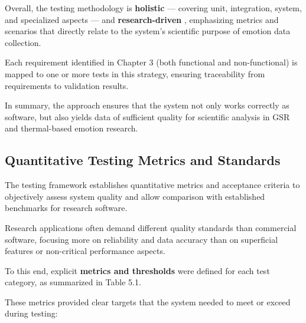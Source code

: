 Overall, the testing methodology is \textbf{holistic}
--- covering unit, integration, system, and specialized aspects --- and \textbf{research-driven}
, emphasizing metrics and scenarios that directly relate to the system's
scientific purpose of emotion data collection.

Each requirement identified in Chapter 3 (both functional and non-functional) is
mapped to one or more tests in this strategy, ensuring traceability from
requirements to validation results.

In summary, the approach ensures that the system not only works correctly as
software, but also yields data of sufficient quality for scientific analysis in
GSR and thermal-based emotion research.

\subsection{Quantitative Testing Metrics and Standards}

The testing framework establishes quantitative metrics and acceptance criteria
to objectively assess system quality and allow comparison with established
benchmarks for research software.

Research applications often demand different quality standards than commercial
software, focusing more on reliability and data accuracy than on superficial
features or non-critical performance aspects.

To this end, explicit \textbf{metrics and thresholds}
 were defined for each test category, as summarized in Table 5.1.

These metrics provided clear targets that the system needed to meet or exceed
during testing:

